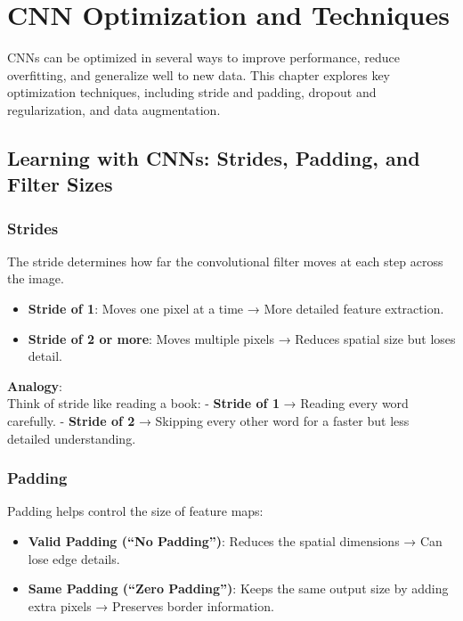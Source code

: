 \documentclass[
  letterpaper,
  DIV=11,
  numbers=noendperiod]{scrreprt}
\providecommand{\tightlist}{%
  \setlength{\itemsep}{0pt}\setlength{\parskip}{0pt}}\usepackage{longtable,booktabs,array}
\begin{document}
\section{CNN Optimization and
Techniques}\label{cnn-optimization-and-techniques}

CNNs can be optimized in several ways to improve performance, reduce
overfitting, and generalize well to new data. This chapter explores key
optimization techniques, including stride and padding, dropout and
regularization, and data augmentation.

\subsection{Learning with CNNs: Strides, Padding, and Filter
Sizes}\label{learning-with-cnns-strides-padding-and-filter-sizes}

\subsubsection{Strides}\label{strides}

The stride determines how far the convolutional filter moves at each
step across the image.

\begin{itemize}
\tightlist
\item
  \textbf{Stride of 1}: Moves one pixel at a time → More detailed
  feature extraction.
\item
  \textbf{Stride of 2 or more}: Moves multiple pixels → Reduces spatial
  size but loses detail.
\end{itemize}

\textbf{Analogy}:\\
Think of stride like reading a book: - \textbf{Stride of 1} → Reading
every word carefully. - \textbf{Stride of 2} → Skipping every other word
for a faster but less detailed understanding.

\subsubsection{Padding}\label{padding}

Padding helps control the size of feature maps:

\begin{itemize}
\tightlist
\item
  \textbf{Valid Padding (``No Padding'')}: Reduces the spatial
  dimensions → Can lose edge details.
\item
  \textbf{Same Padding (``Zero Padding'')}: Keeps the same output size
  by adding extra pixels → Preserves border information.
\end{itemize}
\end{document}
